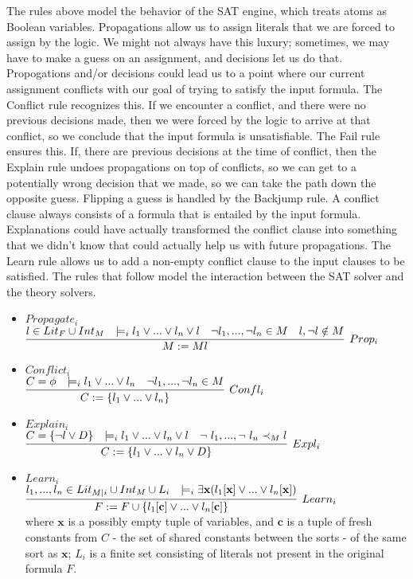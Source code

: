 \documentclass{report}
\begin{document}
The rules above model the behavior of the SAT engine, which treats atoms
as Boolean variables. Propagations allow us to assign 
literals that we are forced to assign by the logic. We 
might not always have this luxury; sometimes, we may have 
to make a guess on an assignment, and decisions let us do 
that. Propogations and/or decisions could lead us to 
a point where our current assignment conflicts with 
our goal of trying to satisfy the input formula. The 
Conflict rule recognizes this. If we encounter a conflict, 
and there were no previous decisions made, then we were 
forced by the logic to arrive at that conflict, so we 
conclude that the input formula is unsatisfiable. The Fail 
rule ensures this. If, there are previous decisions at
the time of conflict, then the Explain rule undoes 
propagations on top of conflicts, so we can get to a 
potentially wrong decision that we made, so we
can take the path down the opposite guess. Flipping a guess 
is handled by the Backjump rule. A conflict clause always 
consists of a formula that is entailed by the input formula. 
Explanations could have actually transformed the conflict 
clause into something that we didn't know that could actually
help us with future propagations. The Learn rule allows us 
to add a non-empty conflict clause to the input clauses to be 
satisfied. The rules that follow model the interaction between 
the SAT solver and the theory solvers.
\begin{itemize}
	\item $Propagate_i$ \\ $\infer[Prop_i]{M := Ml}	{l \in Lit_F \cup Int_M & 
		\models_i l_1 \lor ... \lor 
		l_n \lor l & \neg l_1, ..., \neg l_n \in M & l,\neg l \notin M}$ 
	\item $Conflict_i$ \\ $\infer[Confl_i]{C := \{l_1 \lor ... \lor l_n \}}
	{C = \phi & \models_i l_1 \lor ... \lor l_n & 
		\neg l_1, ..., \neg l_n \in M}$
	\item $Explain_i$ \\ $\infer[Expl_i]{C := \{l_1 \lor ... \lor l_n \lor D\}}
	{C = \{\neg l \lor D\} & \models_i l_1 \lor ... \lor l_n \lor l & 
		\neg\ l_1, ..., \neg\ l_n \prec_M l}$
	\item $Learn_i$ \\ $\infer[Learn_i]{F := F \cup \{l_1[\textbf{c}] 
		\lor ... \lor l_n[\textbf{c}]\}}
	{l_1,...,l_n \in Lit_{M|i} \cup Int_M \cup L_i & 
		\models_i \exists \textbf{x}(l_1[\textbf{x}] \lor ... 
		\lor l_n[\textbf{x}])}$ \\ where $\textbf{x}$ is a possibly empty 
	tuple of variables, and $\textbf{c}$ is a tuple of fresh constants 
	from $C$ - the set of shared constants between the sorts - of the
	same sort as $\textbf{x}$; $L_i$ is a finite set consisting of literals
	not present in the original formula $F$.
\end{itemize}
\end{document}
